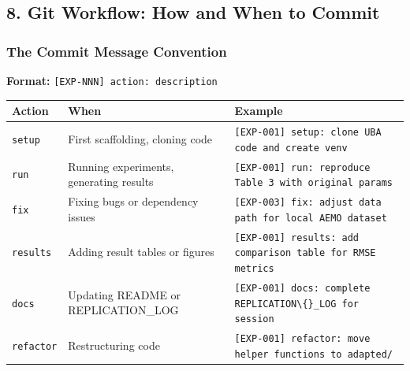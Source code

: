 \subsection{8. Git Workflow: How and When to
Commit}\label{git-workflow-how-and-when-to-commit}

\subsubsection{The Commit Message
Convention}\label{the-commit-message-convention}

\textbf{Format:} \texttt{[EXP-NNN] action: description}

{\def\LTcaptype{none} %
\small
\begin{longtable}[]{@{}
  >{\raggedright\arraybackslash}p{}
  >{\raggedright\arraybackslash}p{}
  >{\raggedright\arraybackslash}p{}@{}}
\toprule\noalign{}
\begin{minipage}[b]{\linewidth}\raggedright
Action
\end{minipage} & \begin{minipage}[b]{\linewidth}\raggedright
When
\end{minipage} & \begin{minipage}[b]{\linewidth}\raggedright
Example
\end{minipage} \\
\midrule\noalign{}
\endhead
\bottomrule\noalign{}
\endlastfoot
\texttt{setup} & First scaffolding, cloning code &
\texttt{[EXP-001] setup: clone UBA code and create venv} \\
\texttt{run} & Running experiments, generating results
&
\texttt{[EXP-001] run: reproduce Table 3 with original params} \\
\texttt{fix} & Fixing bugs or dependency issues &
\texttt{[EXP-003] fix: adjust data path for local AEMO dataset} \\
\texttt{results} & Adding result tables or figures &
\texttt{[EXP-001] results: add comparison table for RMSE metrics} \\
\texttt{docs} & Updating README or REPLICATION\_LOG &
\texttt{[EXP-001] docs: complete REPLICATION\textbackslash\{\}\_LOG for session} \\
\texttt{refactor} & Restructuring code &
\texttt{[EXP-001] refactor: move helper functions to adapted/} \\
\end{longtable}
}

